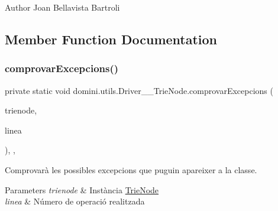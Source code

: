 \begin{DoxyAuthor}{Author}
Joan Bellavista Bartroli 
\end{DoxyAuthor}


\subsection{Member Function Documentation}
\mbox{\label{classdomini_1_1utils_1_1Driver____TrieNode_aa763a74162f647ee153c5cea01d371d0}} 
\subsubsection{\texorpdfstring{comprovar\+Excepcions()}{comprovarExcepcions()}}
{\footnotesize\ttfamily private static void domini.\+utils.\+Driver\+\_\+\+\_\+\+Trie\+Node.\+comprovar\+Excepcions (\begin{DoxyParamCaption}\item[{\hyperlink{classdomini_1_1utils_1_1TrieNode}{Trie\+Node}$<$ Byte $>$}]{trienode,  }\item[{String}]{linea }\end{DoxyParamCaption})\hspace{0.3cm}{\ttfamily [inline]}, {\ttfamily [static]}, {\ttfamily [private]}}



Comprovarà les possibles excepcions que puguin apareixer a la classe. 


\begin{DoxyParams}{Parameters}
{\em trienode} & Instància \hyperlink{classdomini_1_1utils_1_1TrieNode}{Trie\+Node} \\
\hline
{\em linea} & Número de operació realitzada \\
\hline
\end{DoxyParams}
\mbox{\label{classdomini_1_1utils_1_1Driver____TrieNode_a19cb816408fb6b32cca0ea8ae8bc4153}} 
